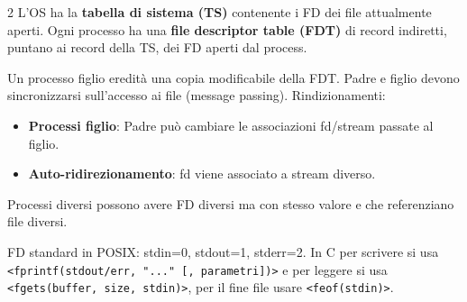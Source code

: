 \begin{multicols}{2}
	L'OS ha la \textbf{tabella di sistema (TS)} contenente i FD dei file attualmente aperti.
	Ogni processo ha una \textbf{file descriptor table (FDT)} di record indiretti, puntano ai record della TS, dei FD aperti dal process.

	Un processo figlio eredità una copia modificabile della FDT. Padre e figlio devono sincronizzarsi sull'accesso ai file (message passing). Rindizionamenti:
	\begin{itemize}[nosep]
		\item \textbf{Processi figlio}: Padre può cambiare le associazioni fd/stream passate al figlio.
		\item \textbf{Auto-ridirezionamento}: fd viene associato a stream diverso.
	\end{itemize}
	Processi diversi possono avere FD diversi ma con stesso valore e che referenziano file diversi.

	FD standard in POSIX: stdin=0, stdout=1, stderr=2.
	In C per scrivere si usa \texttt{<fprintf(stdout/err, "..." [, parametri])>} e per leggere si usa \texttt{<fgets(buffer, size, stdin)>}, per il fine file usare \texttt{<feof(stdin)>}.
\end{multicols}